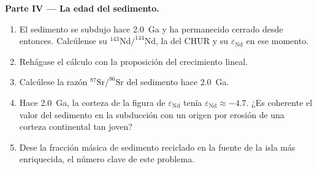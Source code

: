 \begin{problem}
\noindent\textbf{Parte IV --- La edad del sedimento.}
\begin{enumerate}[resume]
\item El sedimento se subdujo hace \qty{2.0}{Ga} y ha permanecido cerrado desde entonces.
Calcúlense su $^{143}\mathrm{Nd}/^{144}\mathrm{Nd}$, la del CHUR y su
$\varepsilon_{\mathrm{Nd}}$ en ese momento.
\item Rehágase el cálculo con la proposición del crecimiento lineal.
\item Calcúlese la razón $^{87}\mathrm{Sr}/^{86}\mathrm{Sr}$ del sedimento hace \qty{2.0}{Ga}.
\item Hace \qty{2.0}{Ga}, la corteza de la figura de $\varepsilon_{\mathrm{Nd}}$ tenía
$\varepsilon_{\mathrm{Nd}} \approx -4.7$. ¿Es coherente el valor del sedimento en la subducción
con un origen por erosión de una corteza continental tan joven?
\item Dese la fracción másica de sedimento reciclado en la fuente de la isla más
enriquecida, el número clave de este problema.
\end{enumerate}
\end{problem}
